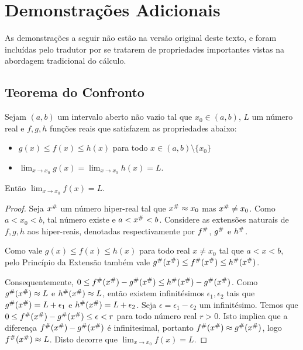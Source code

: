 \chapter{Demonstrações Adicionais}

As demonstrações a seguir não estão na versão original deste texto,
e foram incluídas pelo tradutor por se tratarem de propriedades
importantes vistas na abordagem tradicional do cálculo.

\section{Teorema do Confronto}

\begin{theorem}
Sejam $(a,b)$ um intervalo aberto não vazio tal que $x_0 \in (a,b)$, $L$ um
número real e $f,g,h$ funções reais que satisfazem as propriedades
abaixo:
\begin{itemize}
\item $g(x) \le f(x) \le h(x)$ para todo $x \in (a,b) \setminus \{ x_0 \}$
\item $\lim_{x \rightarrow x_0} g(x) = \lim_{x \rightarrow x_0} h(x) = L.$
\end{itemize}
Então $\lim_{x \rightarrow x_0} f(x) = L$.
\end{theorem}

\begin{proof}
Seja ${x}^\#$ um número hiper-real tal que ${x}^\# \approx x_0$ mas
${x}^\# \ne x_0$. Como $a < x_0 < b$, tal número existe e
$a < {x}^\# < b$. Considere as
extensões naturais de $f,g,h$ aos hiper-reais, denotadas respectivamente
por ${f}^\#$, ${g}^\#$ e ${h}^\#$.

Como vale $g(x) \le f(x) \le h(x)$ para todo real $x \ne x_0$ tal que
$a < x < b$, pelo Princípio da Extensão também vale
${g}^\#({x}^\#) \le {f}^\#({x}^\#) \le {h}^\#({x}^\#)$.

Consequentemente, 
$0 \le {f}^\#({x}^\#) - {g}^\#({x}^\#) \le {h}^\#({x}^\#) - {g}^\#({x}^\#)$. Como ${g}^\#({x}^\#) \approx L$ e ${h}^\#({x}^\#) \approx L$, então existem infinitésimos $\epsilon_1, \epsilon_2$ tais que
${g}^\#({x}^\#) = L + \epsilon_1$ e ${h}^\#({x}^\#) = L + \epsilon_2$. Seja $\epsilon = \epsilon_1 - \epsilon_2$ um infinitésimo. Temos que $0 \le {f}^\#({x}^\#) - {g}^\#({x}^\#) \le \epsilon < r$ para todo número real $r > 0$. Isto implica que a diferença ${f}^\#({x}^\#) - {g}^\#({x}^\#)$ é
infinitesimal, portanto ${f}^\#({x}^\#) \approx {g}^\#({x}^\#)$, logo ${f}^\#({x}^\#) \approx L$. Disto decorre que $\lim_{x \rightarrow x_0} f(x) = L$.
\end{proof}

